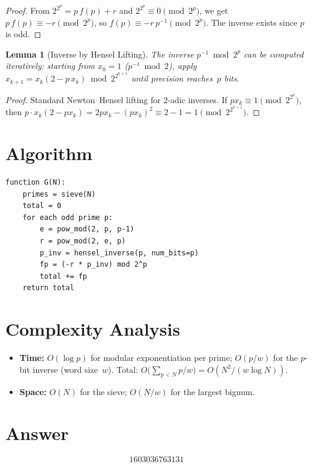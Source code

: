 \documentclass[11pt]{article}
\newtheorem{lemma}[theorem]{Lemma}
\begin{document}
\begin{proof}
From $2^{2^p} = p\,f(p) + r$ and $2^{2^p} \equiv 0 \pmod{2^p}$, we get $p\,f(p) \equiv -r \pmod{2^p}$, so $f(p) \equiv -r\,p^{-1} \pmod{2^p}$. The inverse exists since $p$ is odd.
\end{proof}

\begin{lemma}[Inverse by Hensel Lifting]
The inverse $p^{-1} \bmod 2^p$ can be computed iteratively: starting from $x_0 = 1$ ($p^{-1} \bmod 2$), apply $x_{k+1} = x_k(2 - p\,x_k) \bmod 2^{2^{k+1}}$ until precision reaches~$p$ bits.
\end{lemma}

\begin{proof}
Standard Newton--Hensel lifting for $2$-adic inverses. If $px_k \equiv 1 \pmod{2^{2^k}}$, then $p \cdot x_k(2-px_k) = 2px_k - (px_k)^2 \equiv 2-1 = 1 \pmod{2^{2^{k+1}}}$.
\end{proof}

\section{Algorithm}

\begin{verbatim}
function G(N):
    primes = sieve(N)
    total = 0
    for each odd prime p:
        e = pow_mod(2, p, p-1)
        r = pow_mod(2, e, p)
        p_inv = hensel_inverse(p, num_bits=p)
        fp = (-r * p_inv) mod 2^p
        total += fp
    return total
\end{verbatim}

\section{Complexity Analysis}

\begin{itemize}
    \item \textbf{Time:} $O(\log p)$ for modular exponentiation per prime; $O(p/w)$ for the $p$-bit inverse (word size~$w$). Total: $O\bigl(\sum_{p<N} p/w\bigr) = O(N^2/(w\log N))$.
    \item \textbf{Space:} $O(N)$ for the sieve; $O(N/w)$ for the largest bignum.
\end{itemize}

\section{Answer}

\[
\boxed{1603036763131}
\]
\end{document}

